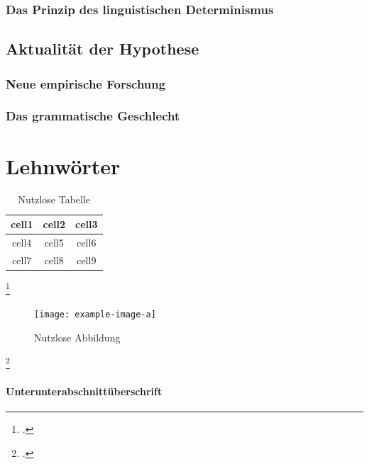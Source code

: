 \documentclass[12pt]{scrreprt}
\begin{document}
		\subsection{Das Prinzip des linguistischen Determinismus}
		\label{sec:lingdetermin}
	\section{Aktualität der Hypothese}
	\label{sec:aktualität}
		\subsection{Neue empirische Forschung}
		\label{sec:empforschung}
		\subsection{Das grammatische Geschlecht}
		\label{sec:gramgeschlecht}

\chapter{Lehnwörter}
\label{chap:lehnwörter}

\begin{table}[!htb]
	\centering
	\caption[Nutzlose Tabelle {\autocite{a}}]{Nutzlose Tabelle\footnotemark}
	\begin{tabular}{ |c|c|c| }
		\hline
		cell1 & cell2 & cell3 \\
		\hline
		cell4 & cell5 & cell6 \\
		cell7 & cell8 & cell9 \\
		\hline
	\end{tabular}
	\label{tab:nutzlos}
\end{table}
\footcitetext{a}

\begin{figure}[!htb]
	\centering
	\texttt{[image: example-image-a]}
	\caption[Nutzlose Abbildung {\autocite{c}}]{Nutzlose Abbildung\footnotemark}
	\label{fig:nutzlos}
\end{figure}
\footcitetext{c}

\subsubsection{Unterunterabschnittüberschrift}
	\label{sec:unterunterabschnitt}
\end{document}
